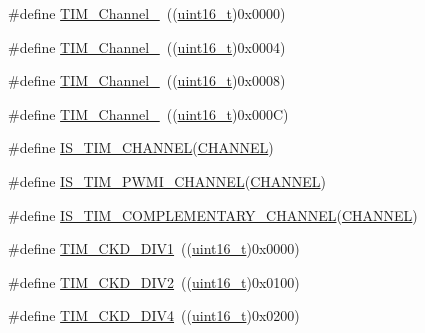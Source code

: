 \begin{DoxyCompactItemize}
\#define \hyperlink{group___t_i_m___channel_ga69ea7f558f02c63dd1082d784d2449bd}{T\+I\+M\+\_\+\+Channel\+\_}~((\hyperlink{_p_e___types_8h_a1f1825b69244eb3ad2c7165ddc99c956}{uint16\+\_\+t})0x0000)
\item 
\#define \hyperlink{group___t_i_m___channel_ga03d7da8269a87a560f68985b4bd80931}{T\+I\+M\+\_\+\+Channel\+\_}~((\hyperlink{_p_e___types_8h_a1f1825b69244eb3ad2c7165ddc99c956}{uint16\+\_\+t})0x0004)
\item 
\#define \hyperlink{group___t_i_m___channel_ga012711b19e8c91f6f352801a3dc0bcc9}{T\+I\+M\+\_\+\+Channel\+\_}~((\hyperlink{_p_e___types_8h_a1f1825b69244eb3ad2c7165ddc99c956}{uint16\+\_\+t})0x0008)
\item 
\#define \hyperlink{group___t_i_m___channel_ga7414888c40d066af235bc1f80b99bd9d}{T\+I\+M\+\_\+\+Channel\+\_}~((\hyperlink{_p_e___types_8h_a1f1825b69244eb3ad2c7165ddc99c956}{uint16\+\_\+t})0x000\+C)
\item 
\#define \hyperlink{group___t_i_m___channel_gae9721e3731e5fd983c83a9c1d32ef03d}{I\+S\+\_\+\+T\+I\+M\+\_\+\+C\+H\+A\+N\+N\+EL}(\hyperlink{samr21__xpro_200std__low__power__mode_200std__low__power__mode_8c_ace6a11e892466500d47d1f45f042bc53}{C\+H\+A\+N\+N\+EL})
\item 
\#define \hyperlink{group___t_i_m___channel_gacbf272b7a14f63b38bdbf18577835dce}{I\+S\+\_\+\+T\+I\+M\+\_\+\+P\+W\+M\+I\+\_\+\+C\+H\+A\+N\+N\+EL}(\hyperlink{samr21__xpro_200std__low__power__mode_200std__low__power__mode_8c_ace6a11e892466500d47d1f45f042bc53}{C\+H\+A\+N\+N\+EL})
\item 
\#define \hyperlink{group___t_i_m___channel_ga6f44459b7dfc4138bbc2c3795311c48c}{I\+S\+\_\+\+T\+I\+M\+\_\+\+C\+O\+M\+P\+L\+E\+M\+E\+N\+T\+A\+R\+Y\+\_\+\+C\+H\+A\+N\+N\+EL}(\hyperlink{samr21__xpro_200std__low__power__mode_200std__low__power__mode_8c_ace6a11e892466500d47d1f45f042bc53}{C\+H\+A\+N\+N\+EL})
\item 
\#define \hyperlink{group___t_i_m___clock___division___c_k_d_ga88691a07b3976791977d280045b3c850}{T\+I\+M\+\_\+\+C\+K\+D\+\_\+\+D\+I\+V1}~((\hyperlink{_p_e___types_8h_a1f1825b69244eb3ad2c7165ddc99c956}{uint16\+\_\+t})0x0000)
\item 
\#define \hyperlink{group___t_i_m___clock___division___c_k_d_ga46a5fd6a173a7e88528a6e4084a08665}{T\+I\+M\+\_\+\+C\+K\+D\+\_\+\+D\+I\+V2}~((\hyperlink{_p_e___types_8h_a1f1825b69244eb3ad2c7165ddc99c956}{uint16\+\_\+t})0x0100)
\item 
\#define \hyperlink{group___t_i_m___clock___division___c_k_d_gac2e5c030f964f9b4c92fa8129fb923bc}{T\+I\+M\+\_\+\+C\+K\+D\+\_\+\+D\+I\+V4}~((\hyperlink{_p_e___types_8h_a1f1825b69244eb3ad2c7165ddc99c956}{uint16\+\_\+t})0x0200)

\end{DoxyCompactItemize}
